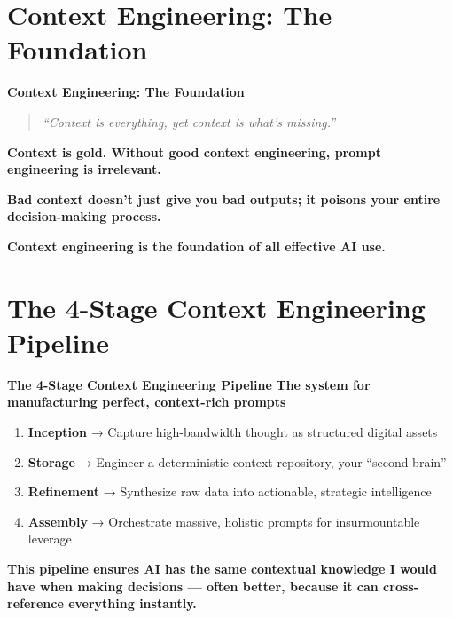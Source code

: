 \documentclass[
  ignorenonframetext,
  aspectratio=169,
]{beamer}
\providecommand{\tightlist}{%
  \setlength{\itemsep}{0pt}\setlength{\parskip}{0pt}}
\begin{document}
\begin{frame}
\end{frame}

\section{\texorpdfstring{\textbf{Context Engineering: The
Foundation}}{Context Engineering: The Foundation}}\label{context-engineering-the-foundation}

\begin{frame}{\textbf{Context Engineering: The Foundation}}
\begin{quote}
\emph{``Context is everything, yet context is what's missing.''}
\end{quote}

\textbf{Context is gold. Without good context engineering, prompt
engineering is irrelevant.}

\textbf{Bad context doesn't just give you bad outputs; it poisons your
entire decision-making process.}

\textbf{Context engineering is the foundation of all effective AI use.}
\end{frame}

\begin{frame}
\end{frame}

\section{\texorpdfstring{\textbf{The 4-Stage Context Engineering
Pipeline}}{The 4-Stage Context Engineering Pipeline}}\label{the-4-stage-context-engineering-pipeline}

\begin{frame}{\textbf{The 4-Stage Context Engineering Pipeline}}
\textbf{The system for manufacturing perfect, context-rich prompts}

\begin{enumerate}
\tightlist
\item
  \textbf{Inception} → Capture high-bandwidth thought as structured
  digital assets
\item
  \textbf{Storage} → Engineer a deterministic context repository, your
  ``second brain''\\
\item
  \textbf{Refinement} → Synthesize raw data into actionable, strategic
  intelligence
\item
  \textbf{Assembly} → Orchestrate massive, holistic prompts for
  insurmountable leverage
\end{enumerate}

\textbf{This pipeline ensures AI has the same contextual knowledge I
would have when making decisions --- often better, because it can
cross-reference everything instantly.}
\end{frame}
\end{document}
